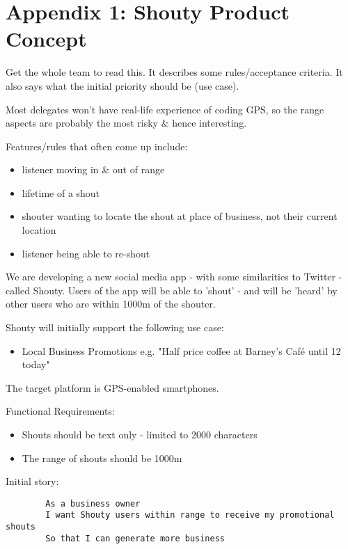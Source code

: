 \chapter*{Appendix 1: Shouty Product Concept}

\ifnotes

    Get the whole team to read this. It describes some rules/acceptance criteria. It also says what the initial priority should be (use case).
    
    Most delegates won't have real-life experience of coding GPS, so the range aspects are probably the most risky \& hence interesting.
    
    Features/rules that often come up include:
    
    \begin{itemize}
        \item listener moving in \& out of range
        \item lifetime of a shout
        \item shouter wanting to locate the shout at place of business, not their current location
        \item listener being able to re-shout
    \end{itemize}

\fi 


\ifcontent

    We are developing a new social media app - with some similarities to Twitter - called Shouty. Users of the app will be able to 'shout' - and will be 'heard' by other users who are within 1000m of the shouter. 
    
    Shouty will initially support the following use case: 
    \begin{itemize}
        \item Local Business Promotions e.g. "Half price coffee at Barney's Café until 12 today"
    \end{itemize}
    
    The target platform is GPS-enabled smartphones.
    
    Functional Requirements:
    \begin{itemize}
        \item Shouts should be text only - limited to 2000 characters
        \item The range of shouts should be 1000m
    \end{itemize}
    
    Initial story:
    \begin{verbatim}
        As a business owner
        I want Shouty users within range to receive my promotional shouts
        So that I can generate more business
    \end{verbatim}

\fi
